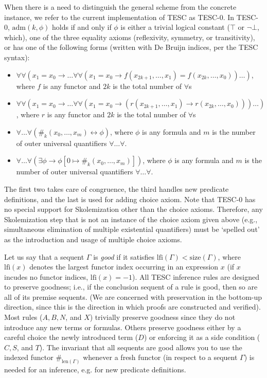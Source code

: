 \documentclass[12pt]{article}
\newcommand{\Len}[0]{\mathrm{len}}
\newcommand{\idf}[1]{\#_{#1}}
\newcommand{\limp}[0]{\to}
\newcommand{\liff}[0]{\leftrightarrow}
\newcommand{\lfi}[0]{\mathrm{lfi}}
\newcommand{\size}[0]{\mathrm{size}}
\begin{document}
When there is a need to distinguish the general scheme from the concrete instance, we refer to
the current implementation of TESC as TESC-0. In TESC-0, $\mathrm{adm}(k, \phi)$ holds if and only if 
$\phi$ is either a trivial logical constant ($\top$ or $\lnot \bot$, which), one of the three equality axioms 
(reflexivity, symmetry, or transitivity), or has one of the following forms (written with De Bruijn indices, per
the TESC syntax):
\begin{itemize}
    \item $\forall \forall (x_1 = x_0 \to \ldots \forall \forall (x_1 = x_0 \to f(x_{2k+1},\ldots,x_1) = f(x_{2k},\ldots,x_0))\ldots)$, 
      where $f$ is any functor and $2k$ is the total number of $\forall$s
    \item $\forall \forall (x_1 = x_0 \to \ldots \forall \forall (x_1 = x_0 \to (r(x_{2k+1},\ldots,x_1) \to r(x_{2k},\ldots,x_0)))\ldots)$,  
      where $r$ is any functor and $2k$ is the total number of $\forall$s
    \item $\forall \ldots \forall (\idf{k}(x_0, \ldots, x_m) \liff \phi)$, 
      where $\phi$ is any formula and $m$ is the number of outer universal quantifiers $\forall \ldots \forall$.
    \item $\forall \ldots \forall (\exists \phi \limp \phi[0 \mapsto \idf{k}(x_0, \ldots, x_m)])$, 
      where $\phi$ is any formula and $m$ is the number of outer universal quantifiers $\forall \ldots \forall$.
\end{itemize}
The first two takes care of congruence, the third handles new predicate definitions, and the last is
used for adding choice axiom. Note that TESC-0 has no special support for Skolemization other 
than the choice axioms. Therefore, any Skolemization step that is not an instance of the choice axiom 
given above (e.g., simultaneous elimination of multiple existential quantifiers) must be `spelled out' 
as the introduction and usage of multiple choice axioms.

Let us say that a sequent $\Gamma$ is \textit{good} if it satisfies $\lfi(\Gamma) < \size(\Gamma)$,
where $\lfi(x)$ denotes the largest functor index occurring in an expression $x$ (if $x$ incudes no 
functor indices, $\lfi(x) = -1$). All TESC inference rules are designed to preserve goodness; i.e.,
if the conclusion sequent of a rule is good, then so are all of its premise sequents. (We are concerned 
with preservation in the bottom-up direction, since this is the direction in which proofs are constructed 
and verified). Most rules ($A, B, N$, and $X$) trivially preserve goodness since they do not introduce 
any new terms or formulas. Others preserve goodness either by a careful choice the newly introduced term
($D$) or enforcing it as a side condition ($C, S$, and $T$). The invariant that all sequents are good 
allows you to use the indexed functor $\idf{\Len(\Gamma)}$ whenever a fresh functor (in respect to a
sequent $\Gamma$) is needed for an inference, e.g. for new predicate definitions.
\end{document}
